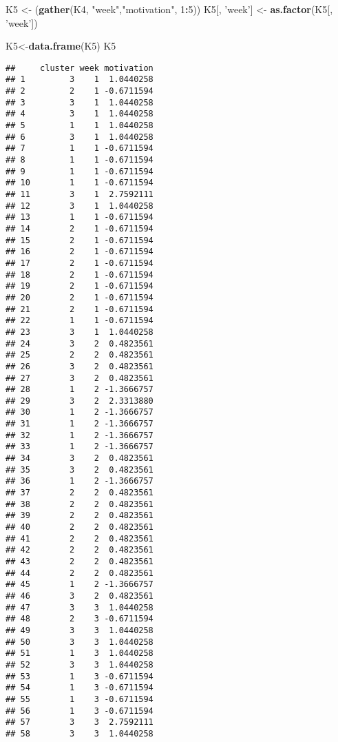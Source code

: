\documentclass[]{article}
\newenvironment{Shaded}{\begin{snugshade}}{\end{snugshade}}
\newcommand{\DecValTok}[1]{\textcolor[rgb]{0.00,0.00,0.81}{#1}}
\newcommand{\KeywordTok}[1]{\textcolor[rgb]{0.13,0.29,0.53}{\textbf{#1}}}
\newcommand{\NormalTok}[1]{#1}
\newcommand{\OperatorTok}[1]{\textcolor[rgb]{0.81,0.36,0.00}{\textbf{#1}}}
\newcommand{\StringTok}[1]{\textcolor[rgb]{0.31,0.60,0.02}{#1}}
\begin{document}
\begin{Shaded}
\begin{Highlighting}[]
\NormalTok{K5 <-}\StringTok{ }\NormalTok{(}\KeywordTok{gather}\NormalTok{(K4, }\StringTok{"week"}\NormalTok{,}\StringTok{"motivation"}\NormalTok{, }\DecValTok{1}\OperatorTok{:}\DecValTok{5}\NormalTok{))}
\NormalTok{K5[, }\StringTok{'week'}\NormalTok{] <-}\StringTok{ }\KeywordTok{as.factor}\NormalTok{(K5[, }\StringTok{'week'}\NormalTok{])}

\NormalTok{K5<-}\KeywordTok{data.frame}\NormalTok{(K5)}
\NormalTok{K5}
\end{Highlighting}
\end{Shaded}

\begin{verbatim}
##     cluster week motivation
## 1         3    1  1.0440258
## 2         2    1 -0.6711594
## 3         3    1  1.0440258
## 4         3    1  1.0440258
## 5         1    1  1.0440258
## 6         3    1  1.0440258
## 7         1    1 -0.6711594
## 8         1    1 -0.6711594
## 9         1    1 -0.6711594
## 10        1    1 -0.6711594
## 11        3    1  2.7592111
## 12        3    1  1.0440258
## 13        1    1 -0.6711594
## 14        2    1 -0.6711594
## 15        2    1 -0.6711594
## 16        2    1 -0.6711594
## 17        2    1 -0.6711594
## 18        2    1 -0.6711594
## 19        2    1 -0.6711594
## 20        2    1 -0.6711594
## 21        2    1 -0.6711594
## 22        1    1 -0.6711594
## 23        3    1  1.0440258
## 24        3    2  0.4823561
## 25        2    2  0.4823561
## 26        3    2  0.4823561
## 27        3    2  0.4823561
## 28        1    2 -1.3666757
## 29        3    2  2.3313880
## 30        1    2 -1.3666757
## 31        1    2 -1.3666757
## 32        1    2 -1.3666757
## 33        1    2 -1.3666757
## 34        3    2  0.4823561
## 35        3    2  0.4823561
## 36        1    2 -1.3666757
## 37        2    2  0.4823561
## 38        2    2  0.4823561
## 39        2    2  0.4823561
## 40        2    2  0.4823561
## 41        2    2  0.4823561
## 42        2    2  0.4823561
## 43        2    2  0.4823561
## 44        2    2  0.4823561
## 45        1    2 -1.3666757
## 46        3    2  0.4823561
## 47        3    3  1.0440258
## 48        2    3 -0.6711594
## 49        3    3  1.0440258
## 50        3    3  1.0440258
## 51        1    3  1.0440258
## 52        3    3  1.0440258
## 53        1    3 -0.6711594
## 54        1    3 -0.6711594
## 55        1    3 -0.6711594
## 56        1    3 -0.6711594
## 57        3    3  2.7592111
## 58        3    3  1.0440258

\end{verbatim}
\end{document}
